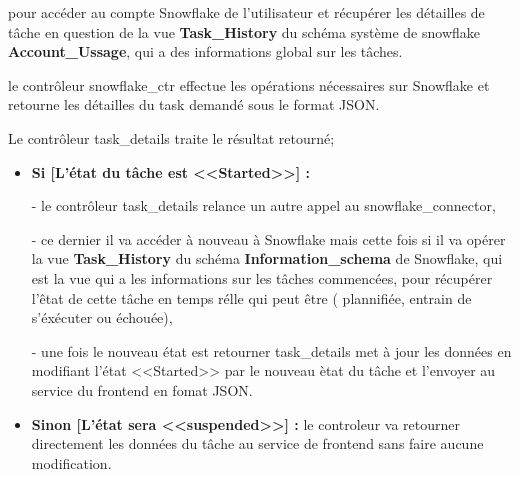     pour accéder au compte Snowflake de l'utilisateur et récupérer les détailles de tâche en question de la vue \textbf{Task\_History} du schéma système de snowflake \textbf{Account\_Ussage}, qui a des informations global sur les tâches.
    \par le contrôleur snowflake\_ctr effectue les opérations nécessaires sur Snowflake et retourne les détailles du task demandé sous le format JSON.
    \par Le contrôleur task\_details traite le résultat retourné; 
    \begin{itemize}
        \item \textbf{Si [L'état du tâche est <<Started>>] :} 
        \par - le contrôleur task\_details relance un autre appel au snowflake\_connector,
        \par - ce dernier il va accéder à nouveau à Snowflake mais cette fois si il va opérer la vue \textbf{Task\_History} du schéma \textbf{Information\_schema} de Snowflake, qui est la vue qui a les informations sur les tâches commencées, pour récupérer l'êtat de cette tâche en temps rélle qui peut être ( plannifiée, entrain de s'éxécuter ou échouée),
        \par - une fois le nouveau état est retourner task\_details met à jour les données en modifiant l'état <<Started>> par le nouveau ètat du tâche et l'envoyer au service du frontend en fomat JSON.
        \item \textbf{Sinon [L'état sera <<suspended>>] :} le controleur va retourner directement les données du tâche au service de frontend sans faire aucune modification.
    \end{itemize}

